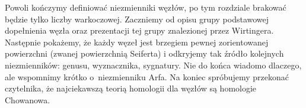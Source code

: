 %

Powoli kończymy definiować niezmienniki węzłów, po tym rozdziale brakować będzie tylko liczby warkoczowej.
Zaczniemy od opisu grupy podstawowej dopełnienia węzła oraz prezentacji tej grupy znalezionej przez Wirtingera.
Następnie pokażemy, że każdy węzeł jest brzegiem pewnej zorientowanej powierzchni (zwanej powierzchnią Seiferta) i odkryjemy tak źródło kolejnych niezmienników: genusu, wyznacznika, sygnatury.
Nie do końca wiadomo dlaczego, ale wspomnimy krótko o~niezmienniku Arfa.
Na koniec spróbujemy przekonać czytelnika, że najciekawszą teorią homologii dla węzłów są homologie Chowanowa.

